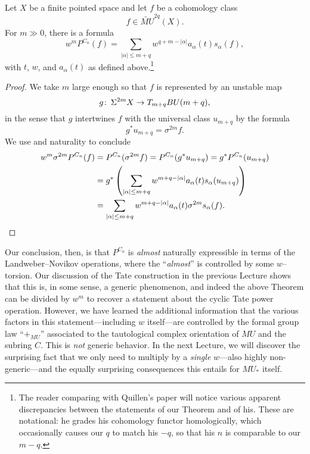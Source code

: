 \begin{theorem}\label{QuillensKeyRelation}
Let \(X\) be a finite pointed space and let \(f\) be a cohomology class \[f \in \widetilde{MU}^{2q}(X).\]  For \(m \gg 0\), there is a formula \[w^m P^{C_n}(f) = \sum_{|\alpha| \le m+q} w^{q+m - |\alpha|} a_\alpha(t) s_\alpha(f),\] with \(t\), \(w\), and \(a_\alpha(t)\) as defined above.\footnote{The reader comparing with Quillen's paper will notice various apparent discrepancies between the statements of our Theorem and of his.  These are notational: he grades his cohomology functor homologically, which occasionally causes our \(q\) to match his \(-q\), so that his \(n\) is comparable to our \(m-q\).}
\end{theorem}
\begin{proof}
We take \(m\) large enough so that \(f\) is represented by an unstable map \[g\colon\thinspace \Sigma^{2m} X \to T_{m+q} BU(m+q),\] in the sense that \(g\) intertwines \(f\) with the universal class \(u_{m+q}\) by the formula \[g^* u_{m+q} = \sigma^{2m} f.\]  We use  and naturality to conclude
\begin{align*}
w^m \sigma^{2m} P^{C_n}(f) & = P^{C_n}(\sigma^{2m} f) = P^{C_n}(g^* u_{m+q}) = g^* P^{C_n}(u_{m+q}) \\
& = g^* \left(\sum_{|\alpha| \le m+q} w^{m+q - |\alpha|} a_\alpha(t) s_\alpha(u_{m+q}) \right) \\
& = \sum_{|\alpha| \le m+q} w^{m+q - |\alpha|} a_\alpha(t) \sigma^{2m} s_\alpha(f). \qedhere
\end{align*}
\end{proof}

Our conclusion, then, is that \(P^{C_n}\) is \emph{almost} naturally expressible in terms of the Landweber--Novikov operations, where the ``\emph{almost}'' is controlled by some \(w\)--torsion.  Our discussion of the Tate construction in the previous Lecture shows that this is, in some sense, a generic phenomenon, and indeed the above Theorem can be divided by \(w^m\) to recover a statement about the cyclic Tate power operation.  However, we have learned the additional information that the various factors in this statement---including \(w\) itself---are controlled by the formal group law ``\(+_{MU}\)'' associated to the tautological complex orientation of \(MU\) and the subring \(C\).  This is \emph{not} generic behavior.  In the next Lecture, we will discover the surprising fact that we only need to multiply by a \emph{single} \(w\)---also highly non-generic---and the equally surprising consequences this entails for \(MU_*\) itself.











